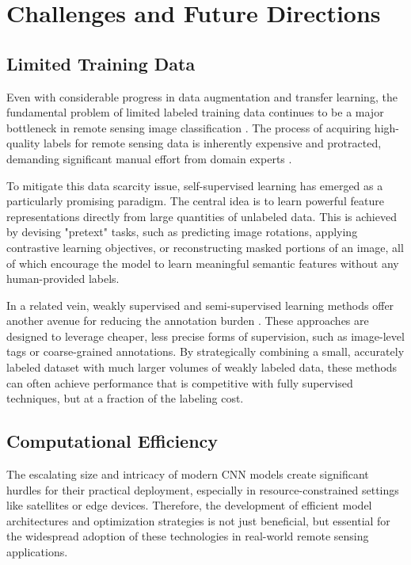 \documentclass[12pt,a4paper]{article}
\begin{document}
\section{Challenges and Future Directions}
\label{sec:challenges}

\subsection{Limited Training Data}
Even with considerable progress in data augmentation and transfer learning, the fundamental problem of limited labeled training data continues to be a major bottleneck in remote sensing image classification \cite{zhu2017deep}. The process of acquiring high-quality labels for remote sensing data is inherently expensive and protracted, demanding significant manual effort from domain experts \cite{xia2017aid}.

To mitigate this data scarcity issue, self-supervised learning has emerged as a particularly promising paradigm. The central idea is to learn powerful feature representations directly from large quantities of unlabeled data. This is achieved by devising "pretext" tasks, such as predicting image rotations, applying contrastive learning objectives, or reconstructing masked portions of an image, all of which encourage the model to learn meaningful semantic features without any human-provided labels.

In a related vein, weakly supervised and semi-supervised learning methods offer another avenue for reducing the annotation burden \cite{zhang2016weakly}. These approaches are designed to leverage cheaper, less precise forms of supervision, such as image-level tags or coarse-grained annotations. By strategically combining a small, accurately labeled dataset with much larger volumes of weakly labeled data, these methods can often achieve performance that is competitive with fully supervised techniques, but at a fraction of the labeling cost.

\subsection{Computational Efficiency}
The escalating size and intricacy of modern CNN models create significant hurdles for their practical deployment, especially in resource-constrained settings like satellites or edge devices. Therefore, the development of efficient model architectures and optimization strategies is not just beneficial, but essential for the widespread adoption of these technologies in real-world remote sensing applications.
\end{document}
